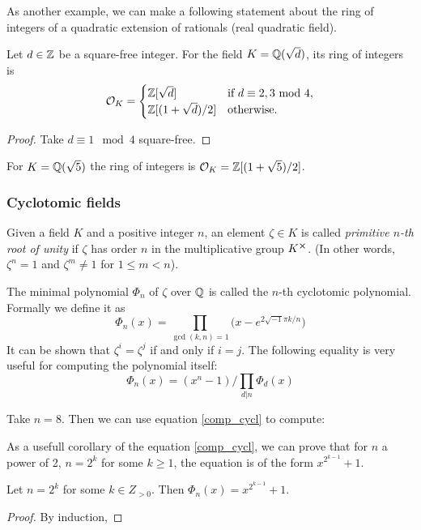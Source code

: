 As another example, we can make a following statement about the ring of integers of a quadratic extension of rationals (real quadratic field).
\begin{lemma}
     Let $d \in \mathbb{Z}$ be a square-free integer. For the field $K = \mathbb{Q}(\sqrt{d})$, its ring of integers is 
     \[ \mathcal{O}_K = 
	 \begin{cases} 
	     \mathbb{Z}[\sqrt{d}] & \text{if $d \equiv 2, 3 \text{ mod } 4$}, \\
	     \mathbb{Z}[(1 + \sqrt{d})/2] & \text{otherwise}.
     	 \end{cases}
     \]
\end{lemma}

\begin{proof}
	Take $d \equiv 1 \mod 4$ square-free.
\end{proof}

\begin{example}
	For $K = \mathbb{Q}(\sqrt{5})$ the ring of integers is $\mathcal{O}_K = \mathbb{Z}[(1 + \sqrt{5})/2]$. 
\end{example}

\subsubsection*{Cyclotomic fields}

\begin{definition}
    Given a field $K$ and a positive integer $n$, an element $\zeta \in K$ is called \textit{primitive $n$-th root of unity} if $\zeta$ has order $n$ in the multiplicative group $K^{\cross}$. (In other words, $\zeta^n = 1$ and $\zeta^m \neq 1$ for $1 \leq m < n$).
\end{definition}
The minimal polynomial $\Phi_n$ of $\zeta$ over $\mathbb{Q}$ is called the $n$-th cyclotomic polynomial. Formally we define it as 
\[ \Phi_n(x) = \prod_{\gcd(k,n) = 1} \bigg( x - e^{2\sqrt{-1} \pi k/n} \bigg) \]
It can be shown that $\zeta^i = \zeta^j$ if and only if $i = j$. The following equality is very useful for computing the polynomial itself:
\begin{equation}\label{comp_cycl} 
\Phi_n(x) = (x^n - 1) \bigg/ \prod_{d | n} \Phi_d(x) 
\end{equation}
\begin{example}
  Take $n = 8$. Then we can use equation \ref{comp_cycl} to compute:
\end{example}
As a usefull corollary of the equation \ref{comp_cycl}, we can prove that for $n$ a power of 2, $n = 2^k$ for some $k \geq 1$, the equation is of the form $x^{2^{k - 1}} + 1$.
\begin{corollary}
  Let $n= 2^k$ for some $k \in Z_{> 0}$. Then $\Phi_n(x) = x^{2^{k-1}} + 1$.
\end{corollary}
\begin{proof}
  By induction,
\end{proof}

